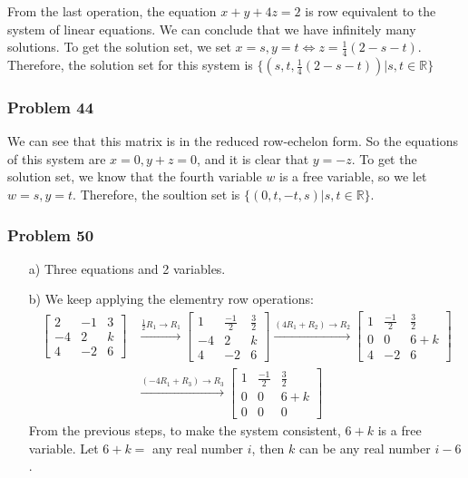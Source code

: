 \documentclass[a4paper,12pt]{article}
\begin{document}
From the last operation, the equation $x+y+4z=2$ is row equivalent to the system of linear equations. We can conclude that we have infinitely many solutions. To get the solution set, we set $x=s, y=t \iff z= \frac{1}{4}(2-s-t)$. Therefore, the solution set for this system is $\{(s,t,\frac{1}{4}(2-s-t))| s,t \in \mathbb{R}\}$
\subsubsection*{Problem 44}
We can see that this matrix is in the reduced row-echelon form. So the equations of this system are $x=0, y+z=0$, and it is clear that $y=-z$. To get the solution set, we know that the fourth variable $w$ is a free variable, so we let $w=s, y=t$. Therefore, the soultion set is $\{(0,t,-t,s)| s,t\in \mathbb{R}\}.$
\subsubsection*{Problem 50}
\begin{itemize}
  \item [a)] Three equations and 2 variables.
  \item [b)] We keep applying the elementry row operations: \begin{align*}
    \begin{bmatrix}
      2 & -1 & 3 \\
      -4 & 2 & k \\
      4 & -2 & 6
    \end{bmatrix} &\xrightarrow{\frac{1}{2}R_1 \to R_1} \begin{bmatrix}
      1 & \frac{-1}{2} & \frac{3}{2}\\
      -4 & 2 & k \\
      4 & -2 & 6
    \end{bmatrix} \xrightarrow{(4R_1+R_2)\to R_2} \begin{bmatrix}
      1 & \frac{-1}{2} & \frac{3}{2}\\
      0 & 0 & 6+k \\
      4 & -2 & 6
    \end{bmatrix} \\ &\xrightarrow{(-4R_1+R_3)\to R_3} \begin{bmatrix}
      1 & \frac{-1}{2} & \frac{3}{2}\\
      0 & 0 & 6+k \\
      0 & 0 & 0
    \end{bmatrix} 
  \end{align*}
From the previous steps, to make the system consistent, $6+k$ is a free variable. Let $6+k =$ any real number $i$, then $k$ can be any real number $i-6$.
\end{itemize}
\end{document}
